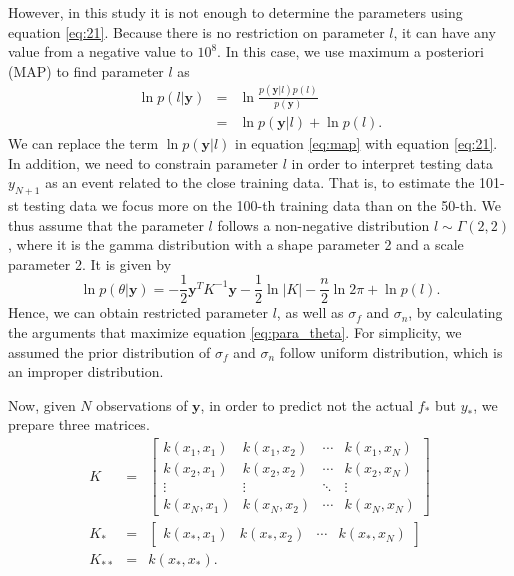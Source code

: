 \documentclass[final,authoryear,5p,times,twocolumn]{elsarticle}
\begin{document}
However, in this study it is not enough to determine the parameters using equation \eqref{eq:21}. Because there is no restriction on parameter $l$, it can have any value from a negative value to $10^8$. In this case, we use maximum a posteriori (MAP) to find parameter $l$ as
\begin{eqnarray} \label{eq:map}
\ln p(l|\mathbf{y})&=&\ln\frac{p(\mathbf{y}|l)p(l)}{p(\mathbf{y})} \nonumber \\
&=& \ln p(\mathbf{y}|l) + \ln p(l).
\end{eqnarray} 
We can replace the term $\ln p(\mathbf{y}|l)$ in equation \eqref{eq:map} with equation \eqref{eq:21}. In addition, we need to constrain parameter $l$ in order to interpret testing data $y_{N+1}$ as an event related to the close training data. That is, to estimate the 101-st testing data we focus more on the 100-th training data than on the 50-th. We thus assume that the parameter $l$ follows a non-negative distribution $l \sim \Gamma (2,2)$, where it is the gamma distribution with a shape parameter 2 and a scale parameter 2. It is given by
\begin{equation} \label{eq:para_theta}
\ln p(\theta|\mathbf{y})=-\frac{1}{2}\mathbf y^TK^{-1}\mathbf y-\frac{1}{2}\ln\left | K \right |-\frac{n}{2}\ln2\pi + \ln p(l).
\end{equation}
Hence, we can obtain restricted parameter $l$, as well as $\sigma_f$ and $\sigma_n$, by calculating the arguments that maximize equation \eqref{eq:para_theta}. For simplicity, we assumed the prior distribution of $\sigma_f$ and $\sigma_n$ follow uniform distribution, which is an improper distribution.

Now, given $N$ observations of $\mathbf{y}$, in order to predict not the actual $f_*$ but $y_*$, we prepare three matrices.
\begin{eqnarray}
K&=&
\begin{bmatrix}
k(x_1,x_1) & k(x_1,x_2) & \cdots & k(x_1,x_N)\\ 
k(x_2,x_1) & k(x_2,x_2) & \cdots & k(x_2,x_N)\\ 
\vdots & \vdots & \ddots & \vdots\\ 
k(x_N,x_1) & k(x_N,x_2) & \cdots & k(x_N,x_N)
\end{bmatrix} \label{eq:22}
\\
K_*&=&
\begin{bmatrix}
k(x_*,x_1) & k(x_*,x_2) & \cdots & k(x_*,x_N) 
\end{bmatrix} \label{eq:23}
\\
K_{**}&=&k(x_*,x_*). \label{eq:24}
\end{eqnarray} 
\end{document}
